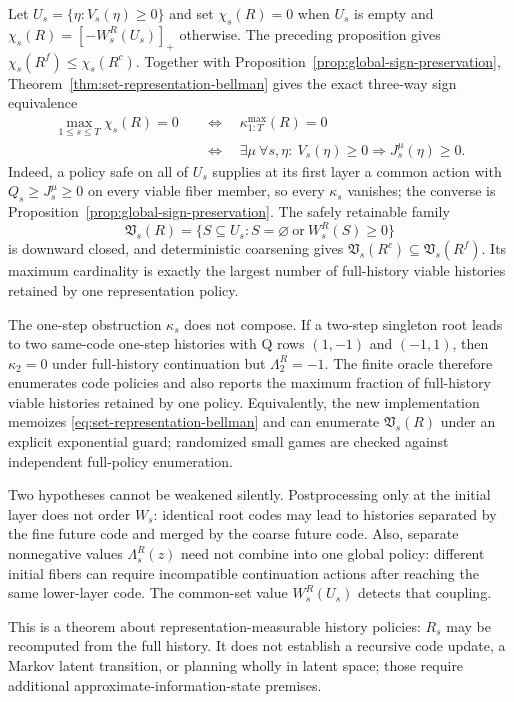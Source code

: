 Let $U_s=\{\eta:V_s(\eta)\geq0\}$ and set $\chi_s(R)=0$ when $U_s$ is empty and
$\chi_s(R)=[-W_s^R(U_s)]_+$ otherwise.  The preceding proposition gives
$\chi_s(R^f)\leq\chi_s(R^c)$.  Together with
Proposition~\ref{prop:global-sign-preservation}, Theorem~\ref{thm:set-representation-bellman} gives
the exact three-way sign equivalence
\[
 \begin{aligned}
 \max_{1\leq s\leq T}\chi_s(R)=0
 &\quad\Longleftrightarrow\quad \kappa_{1:T}^{\max}(R)=0\\
 &\quad\Longleftrightarrow\quad
 \exists\mu\ \forall s,\eta:\
 V_s(\eta)\geq0\Rightarrow J_s^\mu(\eta)\geq0.
 \end{aligned}
\]
Indeed, a policy safe on all of $U_s$ supplies at its first layer a common action with
$Q_s\geq J_s^\mu\geq0$ on every viable fiber member, so every $\kappa_s$ vanishes; the converse is
Proposition~\ref{prop:global-sign-preservation}.  The safely retainable family
\[
 \mathfrak V_s(R)=
 \{S\subseteq U_s:S=\varnothing\ \text{or}\ W_s^R(S)\geq0\}
\]
is downward closed, and deterministic coarsening gives
$\mathfrak V_s(R^c)\subseteq\mathfrak V_s(R^f)$.  Its maximum cardinality is exactly the largest
number of full-history viable histories retained by one representation policy.

The one-step obstruction $\kappa_s$ does not compose.  If a two-step singleton root leads to two
same-code one-step histories with Q rows $(1,-1)$ and $(-1,1)$, then $\kappa_2=0$ under
full-history continuation but $\Lambda_2^R=-1$.  The finite oracle therefore enumerates code
policies and also reports the maximum fraction of full-history viable histories retained by one
policy.  Equivalently, the new implementation memoizes
\eqref{eq:set-representation-bellman} and can enumerate $\mathfrak V_s(R)$ under an explicit
exponential guard; randomized small games are checked against independent full-policy enumeration.

Two hypotheses cannot be weakened silently.  Postprocessing only at the initial layer does not
order $W_s$: identical root codes may lead to histories separated by the fine future code and
merged by the coarse future code.  Also, separate nonnegative values $\Lambda_s^R(z)$ need not
combine into one global policy: different initial fibers can require incompatible continuation
actions after reaching the same lower-layer code.  The common-set value $W_s^R(U_s)$ detects that
coupling.

This is a theorem about representation-measurable history policies: $R_s$ may be recomputed from
the full history.  It does not establish a recursive code update, a Markov latent transition, or
planning wholly in latent space; those require additional approximate-information-state premises.

